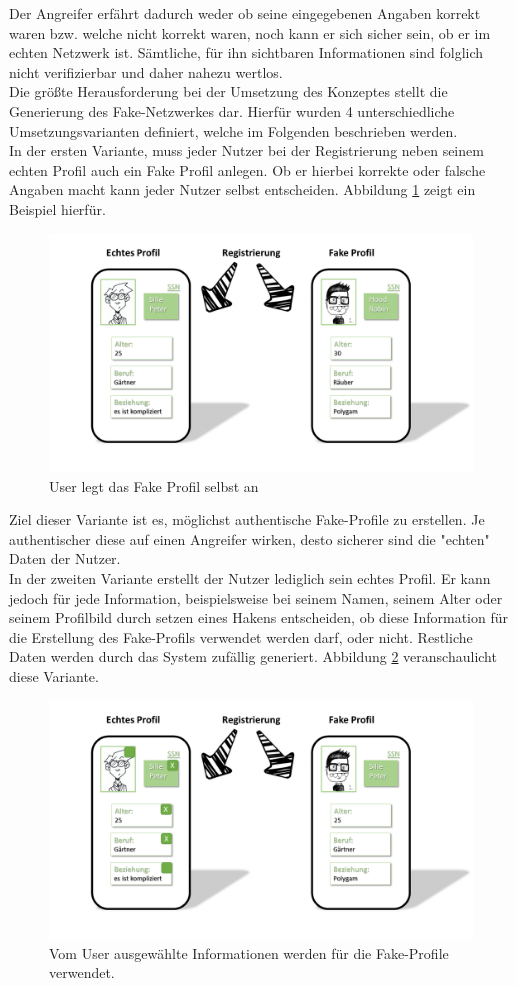 \documentclass{sigchi}
\begin{document}
Der Angreifer erfährt dadurch weder ob seine eingegebenen Angaben korrekt waren bzw. welche nicht korrekt waren, noch kann er sich sicher sein, ob er im echten Netzwerk ist. Sämtliche, für ihn sichtbaren Informationen sind folglich nicht verifizierbar und daher nahezu wertlos. \\
Die größte Herausforderung bei der Umsetzung des Konzeptes stellt die Generierung des Fake-Netzwerkes dar. Hierfür wurden 4 unterschiedliche Umsetzungsvarianten definiert, welche im Folgenden beschrieben werden. \\
In der ersten Variante, muss jeder Nutzer bei der Registrierung neben seinem echten Profil auch ein Fake Profil anlegen. Ob er hierbei korrekte oder falsche Angaben macht kann jeder Nutzer selbst entscheiden. Abbildung \ref{fig:Umsetzung1} zeigt ein Beispiel hierfür. 
\begin{figure}[htbp]
\includegraphics[width=0.8\columnwidth]{figures/Umsetzung1.PNG}
\caption{User legt das Fake Profil selbst an}
\label{fig:Umsetzung1}
\end{figure}
Ziel dieser Variante ist es, möglichst authentische Fake-Profile zu erstellen. Je authentischer diese auf einen Angreifer wirken, desto sicherer sind die "echten" Daten der Nutzer. \\
In der zweiten Variante erstellt der Nutzer lediglich sein echtes Profil. Er kann jedoch für jede Information, beispielsweise bei seinem Namen, seinem Alter oder seinem Profilbild durch setzen eines Hakens entscheiden, ob diese Information für die Erstellung des Fake-Profils verwendet werden darf, oder nicht. Restliche Daten werden durch das System zufällig generiert. Abbildung \ref{fig:Umsetzung2} veranschaulicht diese Variante. 
\begin{figure}[htbp]
	\includegraphics[width=0.8\columnwidth]{figures/Umsetzung2.PNG}
	\caption{Vom User ausgewählte Informationen werden für die Fake-Profile verwendet.}
	\label{fig:Umsetzung2}
\end{figure}
\end{document}
